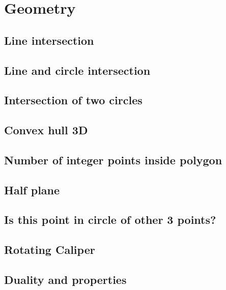 \section{Geometry}
\subsection{Line intersection}
\raggedbottom
\hrulefill
\subsection{Line and circle intersection}
\raggedbottom
\hrulefill
\subsection{Intersection of two circles}
\raggedbottom
\hrulefill
\subsection{Convex hull 3D}
\raggedbottom
\hrulefill
\subsection{Number of integer points inside polygon}
\raggedbottom
\hrulefill
\subsection{Half plane}
\raggedbottom
\hrulefill
\subsection{Is this point in circle of other 3 points?}
\raggedbottom
\hrulefill
\subsection{Rotating Caliper}
\raggedbottom
\hrulefill
\subsection{Duality and properties}

\hrulefill
